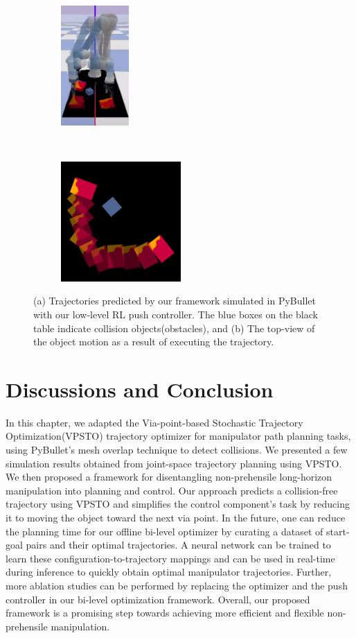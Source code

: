 \begin{figure}[t!]
    \centering
    \begin{subfigure}[t]{0.5\textwidth}
        \centering
        \includegraphics[height=1.8in]{figures/bl-manipulator/bl_sim.png}
    \end{subfigure}%
    ~ 
    \begin{subfigure}[t]{0.5\textwidth}
        \centering
        \includegraphics[height=1.8in]{figures/bl-manipulator/2d_object.png}
    \end{subfigure}
    \caption[Bi-level simulation in PyBullet]{(a) Trajectories predicted by our framework simulated in PyBullet with our low-level RL push controller. The blue boxes on the black table indicate collision objects(obstacles), and (b) The top-view of the object motion as a result of executing the trajectory.}
    \label{fig:bl_sim}
\end{figure}

\section{Discussions and Conclusion}

In this chapter, we adapted the Via-point-based Stochastic Trajectory Optimization(VPSTO) trajectory optimizer for manipulator path planning tasks, using PyBullet's mesh overlap technique to detect collisions. We presented a few simulation results obtained from joint-space trajectory planning using VPSTO. We then proposed a framework for disentangling non-prehensile long-horizon manipulation into planning and control. Our approach predicts a collision-free trajectory using VPSTO and simplifies the control component's task by reducing it to moving the object toward the next via point. In the future, one can reduce the planning time for our offline bi-level optimizer by curating a dataset of start-goal pairs and their optimal trajectories. A neural network can be trained to learn these configuration-to-trajectory mappings and can be used in real-time during inference to quickly obtain optimal manipulator trajectories. Further, more ablation studies can be performed by replacing the optimizer and the push controller in our bi-level optimization framework. Overall, our proposed framework is a promising step towards achieving more efficient and flexible non-prehensile manipulation.